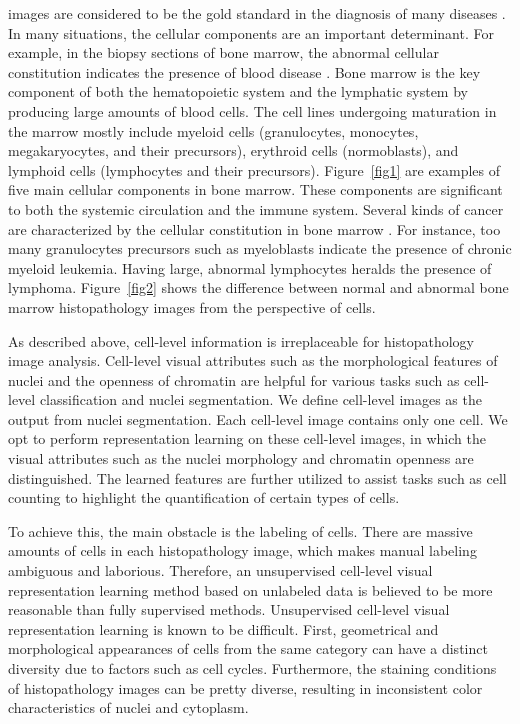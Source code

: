 \documentclass[journal]{IEEEtran}
\begin{document}
 images are considered to be the gold standard in the diagnosis of many diseases \cite{Gurcan2009histopathological}. In many situations, the cellular components are an important determinant. For example, in the biopsy sections of bone marrow, the abnormal cellular constitution indicates the presence of blood disease \cite{Bennett1976Proposals}. Bone marrow is the key component of both the hematopoietic system and the lymphatic system by producing large amounts of blood cells. The cell lines undergoing maturation in the marrow mostly include myeloid cells (granulocytes, monocytes, megakaryocytes, and their precursors), erythroid cells (normoblasts), and lymphoid cells (lymphocytes and their precursors). Figure~\ref{fig1} are examples of five main cellular components in bone marrow. These components are significant to both the systemic circulation and the immune system. Several kinds of cancer are characterized by the cellular constitution in bone marrow \cite{Bennett1976Proposals}. For instance, too many granulocytes precursors such as myeloblasts indicate the presence of chronic myeloid leukemia. Having large, abnormal lymphocytes heralds the presence of lymphoma. Figure~\ref{fig2} shows the difference between normal and abnormal bone marrow histopathology images from the perspective of cells. 

As described above, cell-level information is irreplaceable for histopathology image analysis. Cell-level visual attributes such as the morphological features of nuclei and the openness of chromatin are helpful for various tasks such as cell-level classification and nuclei segmentation. We define cell-level images as the output from nuclei segmentation. Each cell-level image contains only one cell. We opt to perform representation learning on these cell-level images, in which the visual attributes such as the nuclei morphology and chromatin openness are distinguished. The learned features are further utilized to assist tasks such as cell counting to highlight the quantification of certain types of cells.

To achieve this, the main obstacle is the labeling of cells. There are massive amounts of cells in each histopathology image, which makes manual labeling ambiguous and laborious. Therefore, an unsupervised cell-level visual representation learning method based on unlabeled data is believed to be more reasonable than fully supervised methods. Unsupervised cell-level visual representation learning is known to be difficult. First, geometrical and morphological appearances of cells from the same category can have a distinct diversity due to factors such as cell cycles. Furthermore, the staining conditions of histopathology images can be pretty diverse, resulting in inconsistent color characteristics of nuclei and cytoplasm.
\end{document}

